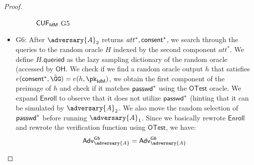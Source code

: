 \begin{proof}
\begin{itemize}
    \begin{figure*}
\caption{$\mathsf{CUF}_{\textsf{IdM}}$ \textsf{G5}}
\label{game:cuf_idmg5}
\end{figure*}

\item \textsf{G6}: After $\adversary{A}_2$ returns $att^*, \mathsf{consent}^*$, we search through the queries to the random oracle $H$ indexed by the second component $att^*$. We define $H.\mathsf{queried}$ as the lazy sampling dictionary of the random oracle (accessed by $\mathsf{OH}$. We check if we find a random oracle output $h$ that satisfies $e(\consent^*, \GGhat) = e(h, \pk_\idm)$, we obtain the first component of the preimage of $h$ and check if it matches $\textsf{passwd}^*$ using the $\mathsf{OTest}$ oracle. We expand $\mathsf{Enroll}$ to observe that it does not utilize $\textsf{passwd}^*$ (hinting that it can be simulated by $\adversary{A}_2$. We also move the random selection of $\textsf{passwd}^*$ before running $\adversary{A}_1$. Since we basically rewrote $\mathsf{Enroll}$ and rewrote the verification function using $\mathsf{OTest}$, we have:
        \begin{align*}
            \advtg_\adversary{A}^{\mathsf{G5}} = \advtg_\adversary{A}^{\mathsf{G6}}\\
        \end{align*}


\end{itemize}
\end{proof}
